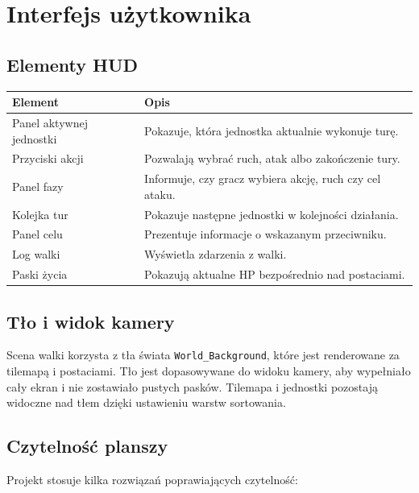 \documentclass[12pt,a4paper]{article}
\begin{document}
\newpage

\section{Interfejs użytkownika}

\subsection{Elementy HUD}

\begin{longtable}{p{4cm} p{10cm}}
\toprule
\textbf{Element} & \textbf{Opis} \\
\midrule
\endhead
Panel aktywnej jednostki & Pokazuje, która jednostka aktualnie wykonuje turę. \\[4pt]
Przyciski akcji & Pozwalają wybrać ruch, atak albo zakończenie tury. \\[4pt]
Panel fazy & Informuje, czy gracz wybiera akcję, ruch czy cel ataku. \\[4pt]
Kolejka tur & Pokazuje następne jednostki w kolejności działania. \\[4pt]
Panel celu & Prezentuje informacje o wskazanym przeciwniku. \\[4pt]
Log walki & Wyświetla zdarzenia z walki. \\[4pt]
Paski życia & Pokazują aktualne HP bezpośrednio nad postaciami. \\
\bottomrule
\end{longtable}

\subsection{Tło i widok kamery}

Scena walki korzysta z tła świata \texttt{World\_Background}, które jest renderowane za tilemapą i postaciami. Tło jest dopasowywane do widoku kamery, aby wypełniało cały ekran i nie zostawiało pustych pasków. Tilemapa i jednostki pozostają widoczne nad tłem dzięki ustawieniu warstw sortowania.

\subsection{Czytelność planszy}

Projekt stosuje kilka rozwiązań poprawiających czytelność:
\end{document}
